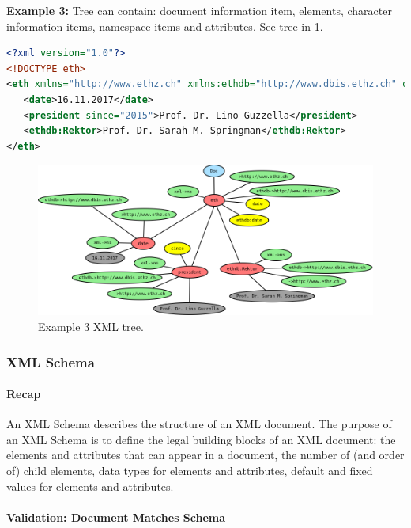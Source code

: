 \textbf{Example 3:} Tree can contain: document information item, elements, character information items, namespace items and attributes. See tree in \ref{fig:xml_tree3}.

\begin{lstlisting}[language=XML]
<?xml version="1.0"?>
<!DOCTYPE eth>
<eth xmlns="http://www.ethz.ch" xmlns:ethdb="http://www.dbis.ethz.ch" date="11.11.2006" ethdb:date="12.11.2006">
   <date>16.11.2017</date>
   <president since="2015">Prof. Dr. Lino Guzzella</president>
   <ethdb:Rektor>Prof. Dr. Sarah M. Springman</ethdb:Rektor>
</eth>
\end{lstlisting}

\begin{figure}[h]
	\centering
	\includegraphics[scale=0.3]{images/6-xml_tree3}
	\caption{Example 3 XML tree.}
	\label{fig:xml_tree3}
\end{figure}



\subsubsection{XML Schema}

\paragraph{Recap}
An XML Schema describes the structure of an XML document. The purpose of an XML Schema is to define the legal building blocks of an XML document: the elements and attributes that can appear in a document, the number of (and order of) child elements, data types for elements and attributes, default and fixed values for elements and attributes.

\paragraph{Validation: Document Matches Schema}

